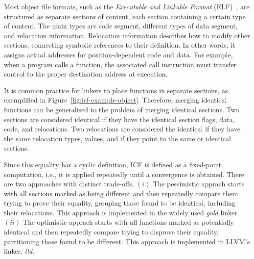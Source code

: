 Most object file formats, such as the \textit{Executable and Linkable Format} (ELF)~\cite{tallam10,kwan12}, are structured as separate sections of content, each section containing a certain type of content.
The main types are code segment, different types of data segment, and relocation information.
Relocation information describes how to modify other sections, connecting symbolic references to their definition.
In other words, it assigns actual addresses for position-dependent code and data.
For example, when a program calls a function, the associated call instruction must transfer control to the proper destination address at execution.

It is common practice for linkers to place functions in separate sections, as exemplified in Figure~\ref{fig:icf-example-object}.
Therefore, merging identical functions can be generalised to the problem of merging identical sections.
Two sections are considered identical if they have the identical section flags, data, code, and relocations.
Two relocations are considered the identical if they have the same relocation types, values, and if they point to the same or identical sections.

Since this equality has a cyclic definition, ICF is defined as a fixed-point computation, i.e., it is applied repeatedly until a convergence is obtained.
There are two approaches with distinct trade-offs.
$(i)$ The pessimistic apprach starts with all sections marked as being different and then repeatedly compare them trying to prove their equality, grouping those found to be identical, including their relocations.
This approach is implemented in the widely used \textit{gold} linker.
$(ii)$ The optimistic apprach starts with all functions marked as potentially identical and then repeatedly compare trying to disprove their equality, partitioning those found to be different.
This approach is implemented in LLVM's linker, \textit{lld}.




